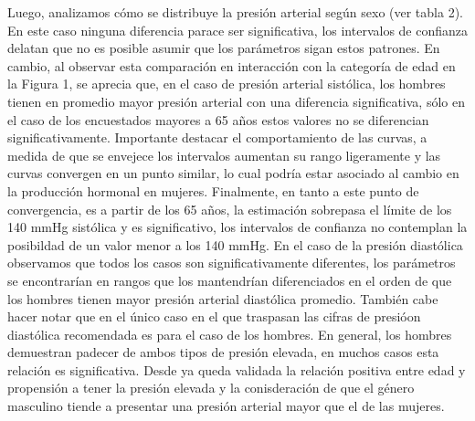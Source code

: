 \documentclass{aa}
\begin{document}
Luego, analizamos cómo se distribuye la presión arterial según sexo (ver tabla 2). En este caso ninguna diferencia parace ser significativa, los intervalos de confianza delatan que no es posible asumir que los parámetros sigan estos patrones. En cambio, al observar esta comparación en interacción con la categoría de edad en la Figura 1, se aprecia que, en el caso de presión arterial sistólica, los hombres tienen en promedio mayor presión arterial con una diferencia significativa, sólo en el caso de los encuestados mayores a 65 años estos valores no se diferencian significativamente. Importante destacar el comportamiento de las curvas, a medida de que se envejece los intervalos aumentan su rango ligeramente y las curvas convergen en un punto similar, lo cual podría estar asociado al cambio en la producción hormonal en mujeres. Finalmente, en tanto a este punto de convergencia, es a partir de los 65 años, la estimación sobrepasa el límite de los 140 mmHg sistólica y es significativo, los intervalos de confianza no contemplan la posibildad de un valor menor a los 140 mmHg. En el caso de la presión diastólica observamos que todos los casos son significativamente diferentes, los parámetros se encontrarían en rangos que los mantendrían diferenciados en el orden de que los hombres tienen mayor presión arterial diastólica promedio. También cabe hacer notar que en el único caso en el que traspasan las cifras de presióon diastólica recomendada es para el caso de los hombres. En general, los hombres demuestran padecer de ambos tipos de presión elevada, en muchos casos esta relación es significativa. Desde ya queda validada la relación positiva entre edad y propensión a tener la presión elevada y la conisderación de que el género masculino tiende a presentar una presión arterial mayor que el de las mujeres.
\end{document}
